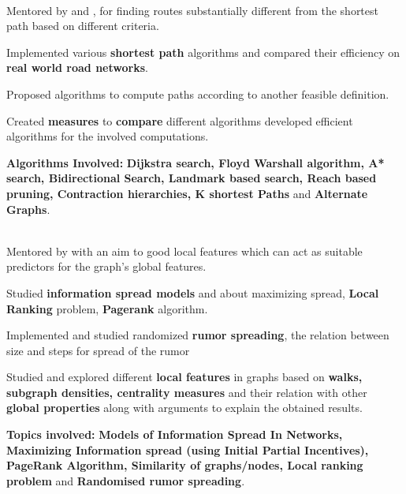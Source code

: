 \documentclass[a4paper]{norm-resume}
\begin{document}
	\vspace{1mm}
	
				
	
\vspace{-2mm} %

	\begin{changemargin}{1.0cm}{0.0cm} 
	{
	\large{}  \\
	\small{Mentored by  and , for finding routes substantially different from the shortest path based on different criteria.} 
	\begin{tightitemize}
	\small
	{
	\item Implemented various \textbf{shortest path} algorithms and compared their efficiency on \textbf{real world road networks}.
	\item Proposed algorithms to compute paths according to another feasible definition.
	\item Created \textbf{measures} to \textbf{compare} different algorithms developed efficient algorithms for the involved computations.
	\item \textbf{Algorithms Involved:} \textbf{Dijkstra search, Floyd Warshall algorithm, A* search, Bidirectional Search, Landmark based search, Reach based pruning, Contraction hierarchies, K shortest Paths} and \textbf{Alternate Graphs}.
	}
	\end{tightitemize}
	
\vspace{1mm} %
			
	\large{} \\
	\small{Mentored by  with an aim to good local features which can act as suitable predictors for the graph's global features.}
	\begin{tightitemize}
	\small
	{
	\item Studied \textbf{information spread models} and about maximizing spread, \textbf{Local Ranking} problem, \textbf{Pagerank} algorithm. 
	\item Implemented and studied randomized \textbf{rumor spreading}, the relation between size and steps for spread of the rumor
	\item Studied and explored different \textbf{local features} in graphs based on \textbf{walks, subgraph densities, centrality measures} and their relation with other \textbf{global properties} along with arguments to explain the obtained results.
	\item \textbf{Topics involved:} \textbf{Models of Information Spread In Networks, Maximizing Information spread (using Initial Partial Incentives), PageRank Algorithm, Similarity of graphs/nodes, Local ranking problem} and \textbf{Randomised rumor spreading}.
	}
	\end{tightitemize}
 	
	}
	\end{changemargin} 	
\end{document}
